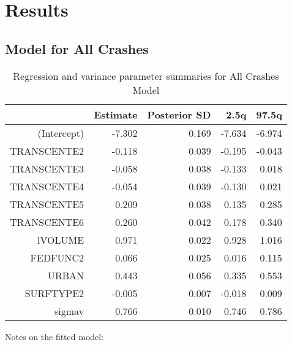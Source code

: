 \documentclass[a4paper]{article}\usepackage[]{graphicx}\usepackage[]{color}
\begin{document}
\clearpage
\section{Results}

\subsection{Model for All Crashes}


\begin{table}[ht]
\centering
\begin{tabular}{rrrrr}
  \hline
 & Estimate & Posterior SD & 2.5q & 97.5q \\ 
  \hline
(Intercept) & -7.302 & 0.169 & -7.634 & -6.974 \\ 
  TRANSCENTE2 & -0.118 & 0.039 & -0.195 & -0.043 \\ 
  TRANSCENTE3 & -0.058 & 0.038 & -0.133 & 0.018 \\ 
  TRANSCENTE4 & -0.054 & 0.039 & -0.130 & 0.021 \\ 
  TRANSCENTE5 & 0.209 & 0.038 & 0.135 & 0.285 \\ 
  TRANSCENTE6 & 0.260 & 0.042 & 0.178 & 0.340 \\ 
  lVOLUME & 0.971 & 0.022 & 0.928 & 1.016 \\ 
  FEDFUNC2 & 0.066 & 0.025 & 0.016 & 0.115 \\ 
  URBAN & 0.443 & 0.056 & 0.335 & 0.553 \\ 
  SURFTYPE2 & -0.005 & 0.007 & -0.018 & 0.009 \\ 
  sigmav & 0.766 & 0.010 & 0.746 & 0.786 \\ 
   \hline
\end{tabular}
\caption{Regression and variance parameter summaries for All Crashes Model} 
\label{allcrash}
\end{table}

Notes on the fitted model:
\end{document}
